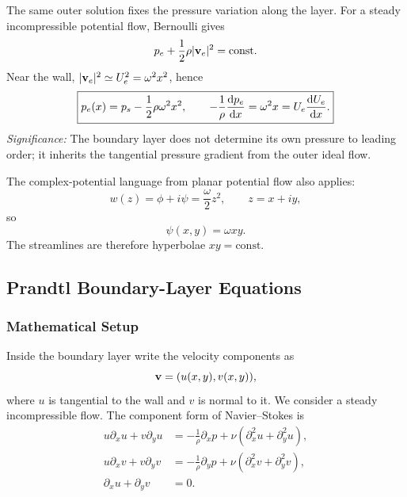 \documentclass[../main.tex]{subfiles}
\begin{document}
The same outer solution fixes the pressure variation along the layer.  For a
steady incompressible potential flow, Bernoulli gives
\begin{equation}
  p_e+\frac12\rho|\mathbf{v}_e|^2=\text{const}.
  \label{eq:lec24_outer_bernoulli}
\end{equation}
Near the wall, $|\mathbf{v}_e|^2\simeq U_e^2=\omega^2x^2$, hence
\begin{equation}
  \boxed{
  p_e(x)=p_s-\frac12\rho\omega^2x^2,\qquad
  -\frac{1}{\rho}\dv{p_e}{x}=\omega^2x=U_e\dv{U_e}{x}.}
  \label{eq:lec24_outer_pressure_gradient}
\end{equation}
\textit{Significance:} The boundary layer does not determine its own pressure
to leading order; it inherits the tangential pressure gradient from the outer
ideal flow.

The complex-potential language from planar potential flow also applies:
\begin{equation}
  w(z)=\phi+i\psi=\frac{\omega}{2}z^2,\qquad z=x+iy,
  \label{eq:lec24_complex_stagnation_potential}
\end{equation}
so
\begin{equation}
  \psi(x,y)=\omega xy.
  \label{eq:lec24_stream_function_outer}
\end{equation}
The streamlines are therefore hyperbolae $xy=\text{const}$.

\subsection{Prandtl Boundary-Layer Equations}\label{sec:lec24:prandtl-equations}

\subsubsection*{Mathematical Setup}
Inside the boundary layer write the velocity components as
\[
  \mathbf{v}=(u(x,y),v(x,y)),
\]
where $u$ is tangential to the wall and $v$ is normal to it.  We consider a
steady incompressible flow.  The component form of Navier--Stokes is
\begin{equation}
  \begin{aligned}
  u\partial_xu+v\partial_yu
  &=-\frac1\rho\partial_xp
    +\nu\left(\partial_x^2u+\partial_y^2u\right),\\
  u\partial_xv+v\partial_yv
  &=-\frac1\rho\partial_yp
    +\nu\left(\partial_x^2v+\partial_y^2v\right),\\
  \partial_xu+\partial_yv&=0.
  \end{aligned}
  \label{eq:lec24_component_ns}
\end{equation}
\end{document}
